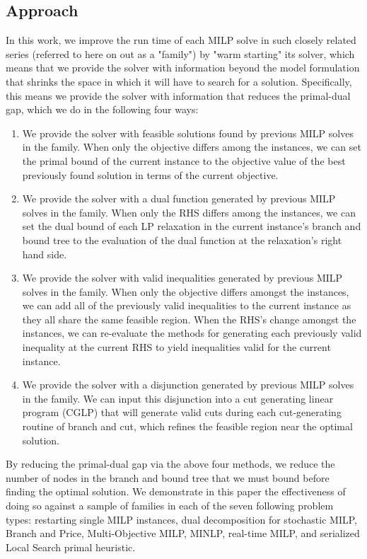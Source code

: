 \documentclass[10pt]{article}
\begin{document}
	\subsection{Approach} \label{ss:approach}
	In this work, we improve the run time of each MILP solve in such closely related series (referred to here on out as a "family") by "warm starting" its solver, which means that we provide the solver with information beyond the model formulation that shrinks the space in which it will have to search for a solution. Specifically, this means we provide the solver with information that reduces the primal-dual gap, which we do in the following four ways:
	\begin{enumerate}
		\item We provide the solver with feasible solutions found by previous MILP solves in the family. When only the objective differs among the instances, we can set the primal bound of the current instance to the objective value of the best previously found solution in terms of the current objective.
		\item We provide the solver with a dual function generated by previous MILP solves in the family. When only the RHS differs among the instances, we can set the dual bound of each LP relaxation in the current instance's branch and bound tree to the evaluation of the dual function at the relaxation's right hand side.
		\item We provide the solver with valid inequalities generated by previous MILP solves in the family. When only the objective differs amongst the instances, we can add all of the previously valid inequalities to the current instance as they all share the same feasible region. When the RHS's change amongst the instances, we can re-evaluate the methods for generating each previously valid inequality at the current RHS to yield inequalities valid for the current instance.
		\item We provide the solver with a disjunction generated by previous MILP solves in the family. We can input this disjunction into a cut generating linear program (CGLP) that will generate valid cuts during each cut-generating routine of branch and cut, which refines the feasible region near the optimal solution.
	\end{enumerate}
	By reducing the primal-dual gap via the above four methods, we reduce the number of nodes in the branch and bound tree that we must bound before finding the optimal solution. We demonstrate in this paper the effectiveness of doing so against a sample of families in each of the seven following problem types: restarting single MILP instances, dual decomposition for stochastic MILP, Branch and Price, Multi-Objective MILP, MINLP, real-time MILP, and serialized Local Search primal heuristic. 
	
\end{document}
